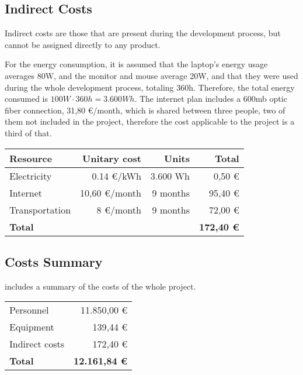 \subsection{Indirect Costs}
Indirect costs are those that are present during the development process, but cannot be assigned directly to any product.

For the energy consumption, it is assumed that the laptop's energy usage averages 80W, and the monitor and mouse average 20W, and that they were used during the whole development process, totaling 360h. Therefore, the total energy consumed is $100W \cdot 360 h = 3.600 Wh$. The internet plan includes a 600mb optic fiber connection, 31,80 €/month, which is shared between three people, two of them not included in the project, therefore the cost applicable to the project is a third of that.


\begin{table}[htb]
    {
      \begin{tabular}{lrrr}
        \toprule
        \textbf{Resource} & \textbf{Unitary cost} & \textbf{Units} & \textbf{Total} \\
        \midrule
        Electricity    &     0.14 €/kWh & 3.600 Wh &  0,50 € \\
        Internet       &  10,60 €/month & 9 months & 95,40 € \\
        Transportation &      8 €/month & 9 months & 72,00 € \\
        \midrule
        \textbf{Total} & & & \textbf{172,40 €} \\
        \bottomrule
      \end{tabular}
    }
\end{table}


\subsection{Costs Summary}\label{subsec:cost-summary}
 includes a summary of the costs of the whole project.

\begin{table}[htb]
    {
      \begin{tabular}{p{5cm}r}
        \toprule
        Personnel          & 11.850,00 € \\
        Equipment          &    139,44 € \\
        Indirect costs     &    172,40 € \\
        \midrule
        \textbf{Total}     & \textbf{12.161,84 €} \\
        \bottomrule
      \end{tabular}
    }
\end{table}

